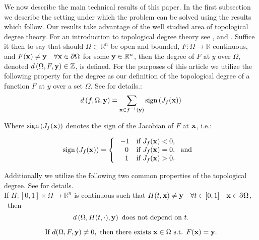 We now describe the main technical results of this paper. 
In the first subsection we describe the setting under which the problem can be solved using the results which follow. Our results take advantage of the well studied area of topological degree theory. 
For an introduction to topological degree theory see \cite{OrChCh2006}, \cite{fonseca1995degree} and \cite{MoVrYa2002}. 
Suffice it then to say that should $\Omega\subset\mathbb{R}^{n}$ be open and bounded, $F:\Omega\rightarrow \mathbb{R}$ continuous, and $F(\bold x)\neq \bold y \quad \forall \bold x\in\partial\Omega$ for some $\bold y\in\mathbb{R}^n$, then the degree of $F$ at $y$ over $\Omega$, denoted $d\left(\Omega,F,\bold y\right)\in\mathbb{Z}$, is defined. 
For the purposes of this article we utilize the following property for the degree as our definition of the topological degree of a function $F$ at $y$ over a set $\Omega$. 
See \cite{OrChCh2006} for details.:
\begin{equation}\label{eq:Deg3}
d\left(f,\Omega,\bold y\right)=\sum\limits_{\bold x\in f^{-1}(\bold y)}\operatorname{sign}\left(J_f(\bold x)\right)
\end{equation}

Where $\operatorname{sign}\left(J_f(\bold x)\right)$ denotes the sign of the Jacobian of $F$ at $\bold x$, i.e.:

\[\operatorname{sign}\left(J_f(\bold x)\right)=   \left\{
\begin{array}{ll}
       \ -1   & \mbox{if } J_f(\bold x)< 0, \\
      \quad 0 & \mbox{if } J_f(\bold x)= 0,~\mbox{ and } \\
      \quad 1 & \mbox{if } J_f(\bold x)> 0. \\
\end{array} 
\right. \]

Additionally we utilize the following two common properties of the topological degree. 
See \cite{OrChCh2006} for details. \\
If $H : [0,1]\times\bar{\Omega}\rightarrow\mathbb{R}^n$ is continuous such that $H(t,\bold x)\neq \bold y \quad \forall t\in[0,1]\quad \bold x\in\partial\Omega$,   \ then 
\begin{equation}\label{eq:Deg1} 
d\left(\Omega,H(t,\cdot),\bold y\right)\text{ does not depend on }t.
\end{equation}

\begin{equation}\label{eq:Deg2}
\text{If }d(\Omega,F,\bold y)\neq 0,\text{ then there exists }\bold x\in\Omega\text{ s.t. }F(\bold x)=\bold y. 
\end{equation}


